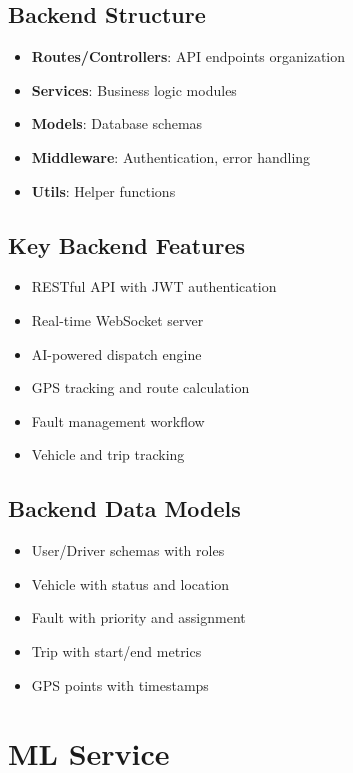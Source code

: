 \subsection{Backend Structure}

\begin{itemize}
    \item \textbf{Routes/Controllers}: API endpoints organization
    \item \textbf{Services}: Business logic modules
    \item \textbf{Models}: Database schemas
    \item \textbf{Middleware}: Authentication, error handling
    \item \textbf{Utils}: Helper functions
\end{itemize}

\subsection{Key Backend Features}

\begin{itemize}
    \item RESTful API with JWT authentication
    \item Real-time WebSocket server
    \item AI-powered dispatch engine
    \item GPS tracking and route calculation
    \item Fault management workflow
    \item Vehicle and trip tracking
\end{itemize}

\subsection{Backend Data Models}

\begin{itemize}
    \item User/Driver schemas with roles
    \item Vehicle with status and location
    \item Fault with priority and assignment
    \item Trip with start/end metrics
    \item GPS points with timestamps
\end{itemize}

\section{ML Service}

